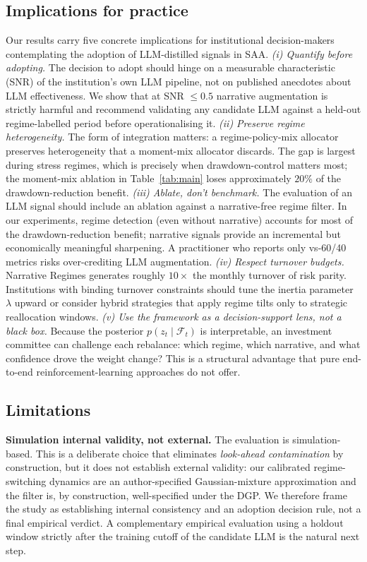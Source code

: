 \documentclass[review,12pt,authoryear]{elsarticle}
\begin{document}
\subsection{Implications for practice}
Our results carry five concrete implications for institutional decision-makers
contemplating the adoption of LLM-distilled signals in SAA.
\emph{(i) Quantify before adopting.} The decision to adopt should hinge on a measurable
characteristic (SNR) of the institution's own LLM pipeline, not on published anecdotes
about LLM effectiveness. We show that at SNR $\le 0.5$ narrative augmentation is
strictly harmful and recommend validating any candidate LLM against a held-out
regime-labelled period before operationalising it.
\emph{(ii) Preserve regime heterogeneity.} The form of integration matters: a
regime-policy-mix allocator preserves heterogeneity that a moment-mix allocator
discards. The gap is largest during stress regimes, which is precisely when
drawdown-control matters most; the moment-mix ablation in Table~\ref{tab:main} loses
approximately $20\%$ of the drawdown-reduction benefit.
\emph{(iii) Ablate, don't benchmark.} The evaluation of an LLM signal should include an
ablation against a narrative-free regime filter. In our experiments, regime detection
(even without narrative) accounts for most of the drawdown-reduction benefit; narrative
signals provide an incremental but economically meaningful sharpening. A practitioner
who reports only vs-60/40 metrics risks over-crediting LLM augmentation.
\emph{(iv) Respect turnover budgets.} Narrative Regimes generates roughly $10\times$ the
monthly turnover of risk parity. Institutions with binding turnover constraints should
tune the inertia parameter $\lambda$ upward or consider hybrid strategies that apply
regime tilts only to strategic reallocation windows.
\emph{(v) Use the framework as a decision-support lens, not a black box.} Because the
posterior $p(z_t \mid \mathcal{F}_t)$ is interpretable, an investment committee can
challenge each rebalance: which regime, which narrative, and what confidence drove the
weight change? This is a structural advantage that pure end-to-end reinforcement-learning
approaches do not offer.

\subsection{Limitations}
\textbf{Simulation internal validity, not external.} The evaluation is simulation-based.
This is a deliberate choice that eliminates \emph{look-ahead contamination} by
construction, but it does not establish external validity: our calibrated
regime-switching dynamics are an author-specified Gaussian-mixture approximation and the
filter is, by construction, well-specified under the DGP. We therefore frame the study
as establishing internal consistency and an adoption decision rule, not a final empirical
verdict. A complementary empirical evaluation using a holdout window strictly after the
training cutoff of the candidate LLM is the natural next step.
\end{document}
